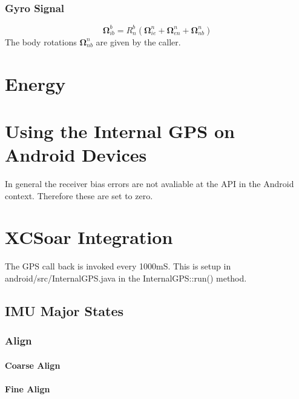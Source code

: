 \documentclass[a4paper]{report}
\numberwithin{equation}{chapter}
\newcommand{\mat}[1]{\boldsymbol{#1}}
\begin{document}
\subsection[Gyro Signal]{Gyro Signal}

\begin{equation}
\mat{\Omega}^b_{ib} = R^b_n \left( \mat{\Omega}^n_{ie} + \mat{\Omega}^n_{en} + \mat{\Omega}^n_{nb} \right)
\end{equation}
The body rotations $\mat{\Omega}^n_{nb}$ are given by the caller.

\clearpage\setcounter{page}{1}
\chapter[Energy]{Energy}

\clearpage\setcounter{page}{1}
\chapter[Using the Internal GPS on Android Devices]{Using the Internal GPS on Android Devices}

In general the receiver bias errors are not avaliable at the API in the Android context. Therefore these are set to zero.

\clearpage\setcounter{page}{1}
\chapter[XCSoar Integration]{XCSoar Integration}

The GPS call back is invoked every 1000mS. This is setup in android/src/InternalGPS.java in the InternalGPS::run() method.

\section[IMU Major States]{IMU Major States}

\subsection[Align]{Align}

\subsubsection[Coarse Align]{Coarse Align}

\subsubsection[Fine Align]{Fine Align}
\end{document}
